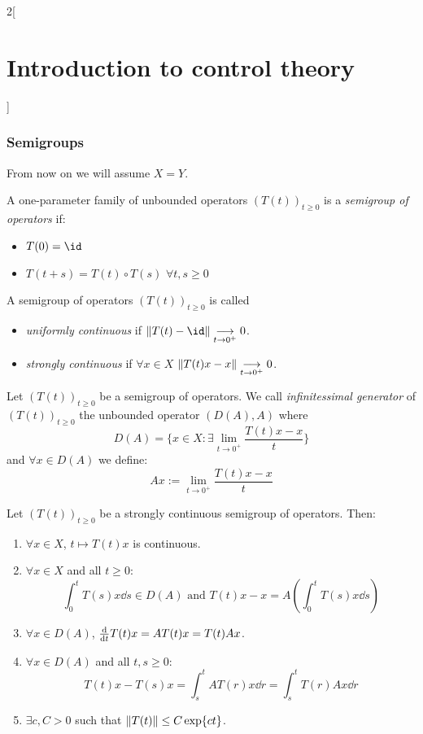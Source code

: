 \documentclass[../../../main_math.tex]{subfiles}
\begin{document}
\begin{multicols}{2}[\section{Introduction to control theory}]
  \subsubsection{Semigroups}
  From now on we will assume $X=Y$.
  \begin{definition}
    A one-parameter family of unbounded operators $(T(t))_{t\geq 0}$ is a \emph{semigroup of operators} if:
    \begin{itemize}
      \item $T(0)=\id$
      \item $T(t+s)=T(t)\circ T(s)$ $\forall t,s\geq 0$
    \end{itemize}
  \end{definition}
  \begin{definition}
    A semigroup of operators $(T(t))_{t\geq 0}$ is called
    \begin{itemize}
      \item \emph{uniformly continuous} if $\norm{T(t)-\id} \underset{t\to 0^+}{\longrightarrow} 0$.
      \item \emph{strongly continuous} if $\forall x\in X$ $\norm{T(t)x-x}\underset{t\to 0^+}{\longrightarrow} 0$.
    \end{itemize}
  \end{definition}
  \begin{definition}
    Let $(T(t))_{t\geq 0}$ be a semigroup of operators. We call \emph{infinitessimal generator} of $(T(t))_{t\geq 0}$ the unbounded operator $(D(A),A)$ where
    $$
      D(A)=\{ x\in X:\exists \lim_{t\to 0^+}\frac{T(t)x-x}{t}\}
    $$
    and $\forall x\in D(A)$ we define:
    $$
      Ax:=\lim_{t\to 0^+}\frac{T(t)x-x}{t}
    $$
  \end{definition}
  \begin{proposition}
    Let $(T(t))_{t\geq 0}$ be a strongly continuous semigroup of operators. Then:
    \begin{enumerate}
      \item $\forall x\in X$, $t\mapsto T(t)x$ is continuous.
      \item $\forall x\in X$ and all $t\geq 0$:
            $$
              \int_0^t T(s)x\dd s\in D(A)\text{ and } T(t)x-x=A\left( \int_0^t T(s)x\dd s\right)
            $$
      \item $\forall x\in D(A)$, $\dv{}{t}T(t)x=AT(t)x=T(t)Ax$.
      \item $\forall x\in D(A)$ and all $t,s\geq 0$:
            $$
              T(t)x-T(s)x=\int_s^tA T(r)x\dd r=\int_s^t T(r)Ax\dd r
            $$
      \item $\exists c,C>0$ such that $\norm{T(t)}\leq C\exp{ct}$.

\end{enumerate}
\end{proposition}
\end{multicols}
\end{document}
